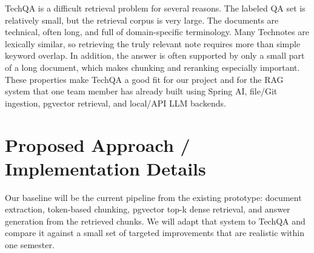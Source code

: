 \documentclass[paper=a4, fontsize=11pt]{scrartcl}
\begin{document}
TechQA is a difficult retrieval problem for several reasons. The labeled QA set is relatively small, but the retrieval corpus is very large. The documents are technical, often long, and full of domain-specific terminology. Many Technotes are lexically similar, so retrieving the truly relevant note requires more than simple keyword overlap. In addition, the answer is often supported by only a small part of a long document, which makes chunking and reranking especially important. These properties make TechQA a good fit for our project and for the RAG system that one team member has already built using Spring AI, file/Git ingestion, pgvector retrieval, and local/API LLM backends.

\section{Proposed Approach / Implementation Details}

Our baseline will be the current pipeline from the existing prototype: document extraction, token-based chunking, pgvector top-k dense retrieval, and answer generation from the retrieved chunks. We will adapt that system to TechQA and compare it against a small set of targeted improvements that are realistic within one semester.
\end{document}
